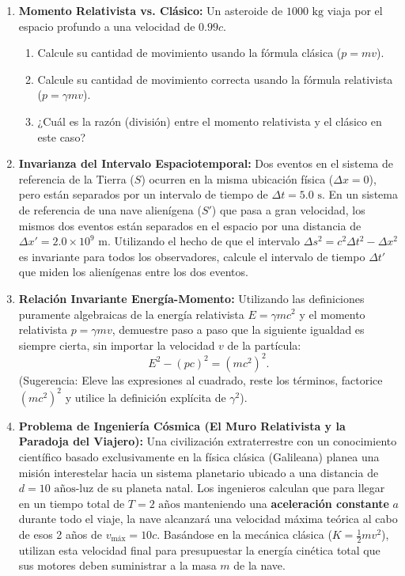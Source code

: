 \documentclass[11pt,a4paper]{book}
\begin{document}
\begin{enumerate}
    \item \textbf{Momento Relativista vs. Clásico:} Un asteroide de $1000 \text{ kg}$ viaja por el espacio profundo a una velocidad de $0.99c$. 
    \begin{enumerate}
        \item Calcule su cantidad de movimiento usando la fórmula clásica ($p = mv$).
        \item Calcule su cantidad de movimiento correcta usando la fórmula relativista ($p = \gamma mv$).
        \item ¿Cuál es la razón (división) entre el momento relativista y el clásico en este caso?
    \end{enumerate}

    \item \textbf{Invarianza del Intervalo Espaciotemporal:} Dos eventos en el sistema de referencia de la Tierra ($S$) ocurren en la misma ubicación física ($\Delta x = 0$), pero están separados por un intervalo de tiempo de $\Delta t = 5.0 \text{ s}$. En un sistema de referencia de una nave alienígena ($S'$) que pasa a gran velocidad, los mismos dos eventos están separados en el espacio por una distancia de $\Delta x' = 2.0 \times 10^9 \text{ m}$. Utilizando el hecho de que el intervalo $\Delta s^2 = c^2\Delta t^2 - \Delta x^2$ es invariante para todos los observadores, calcule el intervalo de tiempo $\Delta t'$ que miden los alienígenas entre los dos eventos.

    \item \textbf{Relación Invariante Energía-Momento:} Utilizando las definiciones puramente algebraicas de la energía relativista $E = \gamma m c^2$ y el momento relativista $p = \gamma m v$, demuestre paso a paso que la siguiente igualdad es siempre cierta, sin importar la velocidad $v$ de la partícula:
    \begin{equation}
        E^2 - (pc)^2 = (mc^2)^2.
    \end{equation}
    (Sugerencia: Eleve las expresiones al cuadrado, reste los términos, factorice $(mc^2)^2$ y utilice la definición explícita de $\gamma^2$).

\item \textbf{Problema de Ingeniería Cósmica (El Muro Relativista y la Paradoja del Viajero):} 
    Una civilización extraterrestre con un conocimiento científico basado exclusivamente en la física clásica (Galileana) planea una misión interestelar hacia un sistema planetario ubicado a una distancia de $d = 10 \text{ años-luz}$ de su planeta natal. Los ingenieros calculan que para llegar en un tiempo total de $T = 2 \text{ años}$ manteniendo una \textbf{aceleración constante} $a$ durante todo el viaje, la nave alcanzará una velocidad máxima teórica al cabo de esos 2 años de $v_{\text{máx}} = 10c$. Basándose en la mecánica clásica ($K = \frac{1}{2}mv^2$), utilizan esta velocidad final para presupuestar la energía cinética total que sus motores deben suministrar a la masa $m$ de la nave.
    

\end{enumerate}
\end{document}

